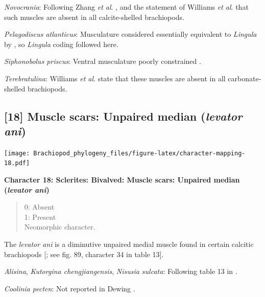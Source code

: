 \documentclass[openany]{book}
\theoremstyle{definition}
\theoremstyle{definition}
\theoremstyle{definition}
\theoremstyle{remark}
\begin{document}
\hypertarget{Novocrania-coding-17}{}
\emph{Novocrania}: Following Zhang \emph{et al}.
\citeyearpar{Zhang2014Anearly}, and the statement of Williams \emph{et
al}. \citeyearpar{Williams2000LinguliformeaCraniiformea} that such
muscles are absent in all calcite-shelled brachiopods.

\hypertarget{Pelagodiscus_atlanticus-coding-17}{}
\emph{Pelagodiscus atlanticus}: Musculature considered essentially
equivalent to \emph{Lingula} by
\citet{Williams2000LinguliformeaCraniiformea}, so \emph{Lingula} coding
followed here.

\hypertarget{Siphonobolus_priscus-coding-17}{}
\emph{Siphonobolus priscus}: Ventral musculature poorly constrained
\citep{Williams2000LinguliformeaCraniiformea, Popov2009Earlyontogeny}.

\hypertarget{Terebratulina-coding-17}{}
\emph{Terebratulina}: Williams \emph{et al}.
\citeyearpar[p.~32]{Williams2000LinguliformeaCraniiformea} state that
these muscles are absent in all carbonate-shelled brachiopods.

\subsection*{\texorpdfstring{{[}18{]} Muscle scars: Unpaired median
(\emph{levator
ani})}{{[}18{]} Muscle scars: Unpaired median (levator ani)}}\label{muscle-scars-unpaired-median-levator-ani}

\texttt{[image: Brachiopod\_phylogeny\_files/figure-latex/character-mapping-18.pdf]}

\textbf{Character 18: Sclerites: Bivalved: Muscle scars: Unpaired median
(\emph{levator ani})}

\begin{quote}
0: Absent\\
1: Present\\
Neomorphic character.
\end{quote}

The \emph{levator ani} is a diminutive unpaired medial muscle found in
certain calcitic brachiopods
{[}\citet{Williams2000LinguliformeaCraniiformea}; see fig. 89, character
34 in table 13{]}.

\hypertarget{Alisina-coding-18}{}
\emph{Alisina}, \emph{Kutorgina chengjiangensis}, \emph{Nisusia
sulcata}: Following table 13 in
\citet{Williams2000LinguliformeaCraniiformea}.

\hypertarget{Coolinia_pecten-coding-18}{}
\emph{Coolinia pecten}: Not reported in Dewing
\citeyearpar{Dewing2001Hingemodifications}.
\end{document}
